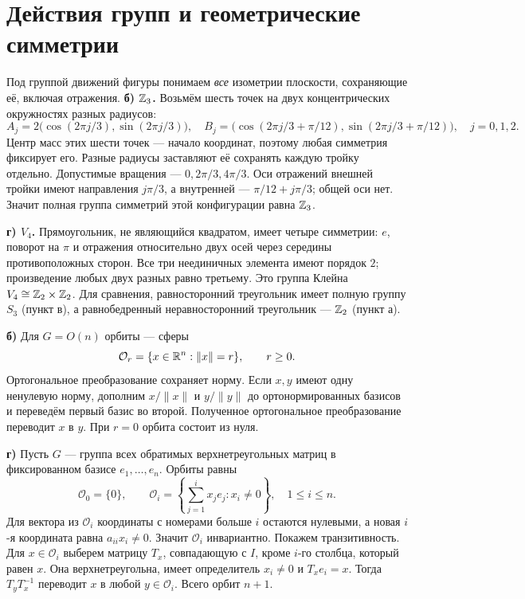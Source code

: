 \section{Действия групп и геометрические симметрии}

Под группой движений фигуры понимаем \emph{все} изометрии плоскости,
сохраняющие её, включая отражения.
\textbf{б) $\mathbb{Z}_3$.} Возьмём шесть точек на двух концентрических
окружностях разных радиусов:
\[
 A_j=2\bigl(\cos(2\pi j/3),\sin(2\pi j/3)\bigr),\quad
 B_j=\bigl(\cos(2\pi j/3+\pi/12),\sin(2\pi j/3+\pi/12)\bigr),
 \quad j=0,1,2.
\]
Центр масс этих шести точек --- начало координат, поэтому любая
симметрия фиксирует его. Разные радиусы заставляют её сохранять
каждую тройку отдельно. Допустимые вращения --- $0,2\pi/3,4\pi/3$.
Оси отражений внешней тройки имеют направления $j\pi/3$,
а внутренней --- $\pi/12+j\pi/3$; общей оси нет.
Значит полная группа симметрий этой конфигурации равна $\mathbb{Z}_3$.
\begin{center}
\end{center}
\textbf{г) $V_4$.} Прямоугольник, не являющийся квадратом,
имеет четыре симметрии: $e$, поворот на $\pi$ и отражения
относительно двух осей через середины противоположных сторон.
Все три неединичных элемента имеют порядок $2$;
произведение любых двух разных равно третьему.
Это группа Клейна $V_4\cong\mathbb{Z}_2\times\mathbb{Z}_2$.
Для сравнения, равносторонний треугольник имеет полную группу $S_3$
(пункт в), а равнобедренный неравносторонний треугольник --- $\mathbb{Z}_2$
(пункт а).

\textbf{б)} Для $G=O(n)$ орбиты --- сферы
\[\mathcal O_r=\{x\in\mathbb{R}^n:\|x\|=r\},\qquad r\ge0.\]
Ортогональное преобразование сохраняет норму.
Если $x,y$ имеют одну ненулевую норму, дополним $x/\|x\|$
и $y/\|y\|$ до ортонормированных базисов и переведём первый
базис во второй. Полученное ортогональное преобразование переводит
$x$ в $y$. При $r=0$ орбита состоит из нуля.

\textbf{г)} Пусть $G$ --- группа всех обратимых верхнетреугольных
матриц в фиксированном базисе $e_1,\dots,e_n$.
Орбиты равны
\[
 \mathcal O_0=\{0\},\qquad
 \mathcal O_i=\left\{\sum_{j=1}^i x_je_j:x_i\ne0\right\},
 \quad 1\le i\le n.
\]
Для вектора из $\mathcal O_i$ координаты с номерами больше $i$
остаются нулевыми, а новая $i$-я координата равна $a_{ii}x_i\ne0$.
Значит $\mathcal O_i$ инвариантно.
Покажем транзитивность. Для $x\in\mathcal O_i$ выберем матрицу
$T_x$, совпадающую с $I$, кроме $i$-го столбца, который равен $x$.
Она верхнетреугольна, имеет определитель $x_i\ne0$ и
$T_xe_i=x$. Тогда $T_yT_x^{-1}$ переводит $x$ в любой
$y\in\mathcal O_i$. Всего орбит $n+1$.

